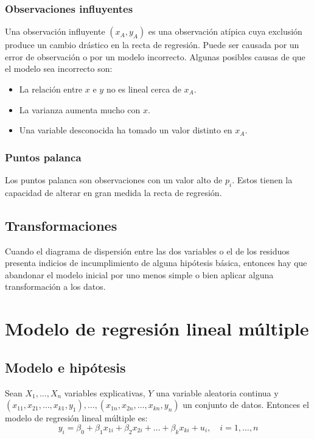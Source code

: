 \documentclass{report}
\theoremstyle{remark}
\theoremstyle{remark}
\theoremstyle{remark}
\theoremstyle{definition}
\theoremstyle{definition}
\theoremstyle{definition}
\begin{document}
\subsection*{Observaciones influyentes}
Una observación influyente $(x_A, y_A)$ es una observación atípica cuya exclusión produce un cambio drástico en la recta de regresión.
Puede ser causada por un error de observación o por un modelo incorrecto.
Algunas posibles causas de que el modelo sea incorrecto son:
\begin{itemize}
    \item La relación entre $x$ e $y$ no es lineal cerca de $x_A$.
    \item La varianza aumenta mucho con $x$.
    \item Una variable desconocida ha tomado un valor distinto en $x_A$.
\end{itemize}

\subsection*{Puntos palanca}
Los puntos palanca son observaciones con un valor alto de $p_i$.
Estos tienen la capacidad de alterar en gran medida la recta de regresión.

\section{Transformaciones}
Cuando el diagrama de dispersión entre las dos variables o el de los residuos presenta indicios de incumplimiento de alguna hipótesis básica, entonces hay que abandonar el modelo inicial por uno menos simple o bien aplicar alguna transformación a los datos.

\chapter{Modelo de regresión lineal múltiple}
\section{Modelo e hipótesis}
Sean $X_1, \dots, X_n$ variables explicativas, $Y$ una variable aleatoria continua y $(x_{11}, x_{21}, \dots, x_{k1}, y_1), \dots, (x_{1n}, x_{2n}, \dots, x_{kn}, y_n)$ un conjunto de datos.
Entonces el modelo de regresión lineal múltiple es:
$$y_i = \beta_0 + \beta_1 x_{1i} + \beta_2 x_{2i} + \dots + \beta_k x_{ki} + u_i, \quad i = 1, \dots, n$$
\end{document}
